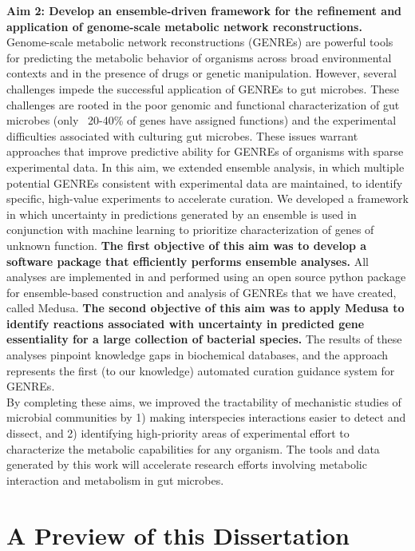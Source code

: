 \documentclass[11pt,onecolumn,notitlepage,openany,twoside]{book}
\begin{document}
\begin{refsection}
\textbf{Aim 2: Develop an ensemble-driven framework for the refinement and application of genome-scale metabolic network reconstructions.} Genome-scale metabolic network reconstructions (GENREs) are powerful tools for predicting the metabolic behavior of organisms across broad environmental contexts and in the presence of drugs or genetic manipulation. However, several challenges impede the successful application of GENREs to gut microbes. These challenges are rooted in the poor genomic and functional characterization of gut microbes (only ~20-40\% of genes have assigned functions) and the experimental difficulties associated with culturing gut microbes. These issues warrant approaches that improve predictive ability for GENREs of organisms with sparse experimental data. In this aim, we extended ensemble analysis, in which multiple potential GENREs consistent with experimental data are maintained, to identify specific, high-value experiments to accelerate curation. We developed a framework in which uncertainty in predictions generated by an ensemble is used in conjunction with machine learning to prioritize characterization of genes of unknown function. \textbf{The first objective of this aim was to develop a software package that efficiently performs ensemble analyses.} All analyses are implemented in and performed using an open source python package for ensemble-based construction and analysis of GENREs that we have created, called Medusa. \textbf{The second objective of this aim was to apply Medusa to identify reactions associated with uncertainty in predicted gene essentiality for a large collection of bacterial species.} The results of these analyses pinpoint knowledge gaps in biochemical databases, and the approach represents the first (to our knowledge) automated curation guidance system for GENREs.\\[12pt]

By completing these aims, we improved the tractability of mechanistic studies of microbial communities by 1) making interspecies interactions easier to detect and dissect, and 2) identifying high-priority areas of experimental effort to characterize the metabolic capabilities for any organism. The tools and data generated by this work will accelerate research efforts involving metabolic interaction and metabolism in gut microbes.

\section{A Preview of this Dissertation}


\end{refsection}
\end{document}
